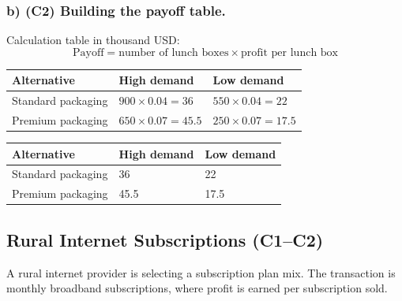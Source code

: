 	\subsubsection*{b) \textbf{(C2)} Building the payoff table.}
	\label{subsec:problem4-community-bakery-lunch-boxes-c2}
	Calculation table in thousand USD:
	\[
	\text{Payoff}=\text{number of lunch boxes}\times\text{profit per lunch box}
	\]
	\begin{center}
		\begin{tabular}{lll}
			\toprule
			Alternative & High demand & Low demand \\
			\midrule
			Standard packaging & $900 \times 0.04 = 36$ & $550 \times 0.04 = 22$ \\
			Premium packaging & $650 \times 0.07 = 45.5$ & $250 \times 0.07 = 17.5$ \\
			\bottomrule
		\end{tabular}
	\end{center}
	
	\begin{center}
		\begin{tabular}{lll}
			\toprule
			Alternative & High demand & Low demand \\
			\midrule
			Standard packaging & 36 & 22 \\
			Premium packaging & 45.5 & 17.5 \\
			\bottomrule
		\end{tabular}
	\end{center}
	
	
	\subsection{Rural Internet Subscriptions (C1--C2)}
	\label{sec:problem5-rural-internet-subscriptions-c1-c2}
	A rural internet provider is selecting a subscription plan mix. The transaction is monthly broadband subscriptions, where profit is earned per subscription sold.
	
